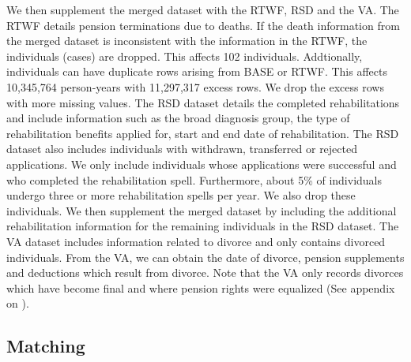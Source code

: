 \documentclass[a4paper,12pt]{article}
\theoremstyle{plain}
\theoremstyle{definition}
\theoremstyle{TheoremNum}
\theoremstyle{CorollaryNum}
\theoremstyle{PropositionNum}
\theoremstyle{TheoremNum}
\begin{document}
We then supplement the merged dataset with the RTWF, RSD and the VA. The RTWF details pension terminations due to deaths. If the death information from the merged dataset is inconsistent with the information in the RTWF, the individuals (cases) are dropped. This affects 102 individuals. Addtionally, individuals can have duplicate rows arising from BASE or RTWF. This affects 10,345,764 person-years with 11,297,317 excess rows. We drop the excess rows with more missing values. The RSD dataset details the completed rehabilitations and include information such as the broad diagnosis group, the type of rehabilitation benefits applied for, start and end date of rehabilitation. The RSD dataset also includes individuals with withdrawn, transferred or rejected applications. We only include individuals whose applications were successful and who completed the rehabilitation spell. Furthermore, about 5\% of individuals undergo three or more rehabilitation spells per year. We also drop these individuals. We then supplement the merged dataset by including the additional rehabilitation information for the remaining individuals in the RSD dataset. The VA dataset includes information related to divorce and only contains divorced individuals. From the VA, we can obtain the date of divorce, pension supplements and deductions which result from divorce. Note that the VA only records divorces which have become final and where pension rights were equalized (See appendix on ). 


\subsection{Matching}
\end{document}

